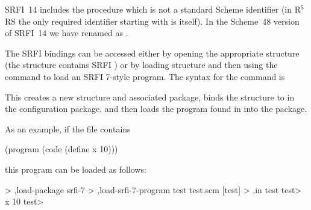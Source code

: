 SRFI~14 includes the procedure  which is not a standard
 Scheme identifier (in R$^5$RS the only required identifier starting
 with \code{-} is \code{-} itself).
In the Scheme~48 version of SRFI~14 we have renamed 
 as .

The SRFI bindings can be accessed either by opening the appropriate structure
 (the structure  contains SRFI )
 or by loading structure  and then using
 the  command to load an SRFI 7-style program.
The syntax for the command is
\begin{example}
\end{example}
This creates a new structure and associated package, binds the structure
 to  in the configuration package, and then loads the program
 found in  into the package.

As an example, if the file  contains
\begin{example}
(program (code (define x 10)))
\end{example}
this program can be loaded as follows:
\begin{example}
> ,load-package srfi-7
> ,load-srfi-7-program test test.scm
[test]
> ,in test
test> x
10
test> 
\end{example}

